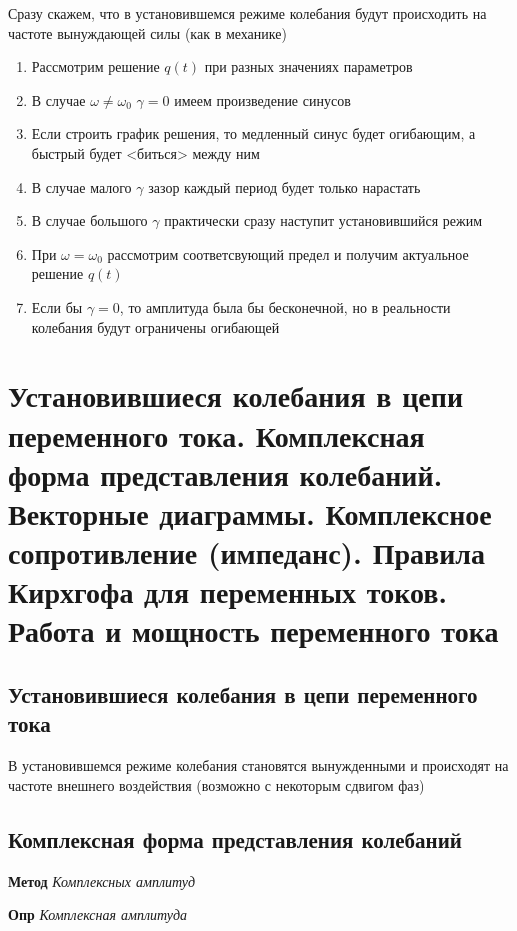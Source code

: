 \documentclass[a4paper, 14pt]{article}
\begin{document}
    Сразу скажем, что в установившемся режиме колебания будут происходить на частоте вынуждающей силы (как в механике)
    
    \begin{enumerate}
        \item Рассмотрим решение $q(t)$ при разных значениях параметров
        \item В случае $\omega \neq \omega_0$ $\gamma = 0$ имеем произведение синусов
        \item Если строить график решения, то медленный синус будет огибающим, а быстрый будет <биться> между ним
        \item В случае малого $\gamma$ зазор каждый период будет только нарастать
        \item В случае большого $\gamma$ практически сразу наступит установившийся режим
        \item При $\omega = \omega_0$ рассмотрим соответсвующий предел и получим актуальное решение $q(t)$
        \item Если бы $\gamma = 0$, то амплитуда была бы бесконечной, но в реальности колебания будут ограничены
        огибающей
    \end{enumerate}
    
    \section{Установившиеся колебания в цепи переменного тока.
    Комплексная форма представления колебаний.
    Векторные диаграммы.
    Комплексное сопротивление (импеданс).
    Правила Кирхгофа для переменных токов.
    Работа и мощность переменного тока}
    
    \subsection{Установившиеся колебания в цепи переменного тока}
    
    В установившемся режиме колебания становятся вынужденными и происходят на частоте внешнего воздействия (возможно с
    некоторым сдвигом фаз)
    
    \subsection{Комплексная форма представления колебаний}
    
    \textbf{Метод} \textit{Комплексных амплитуд}
    
    \textbf{Опр} \textit{Комплексная амплитуда}
    
\end{document}
